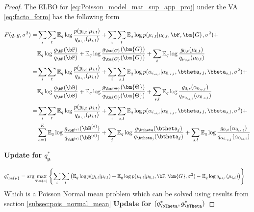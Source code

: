  
\begin{proof}

The ELBO for \ref{eq:Poisson_model_mat_sup_app_proj}  under the VA \ref{eq:facto_form} has the following form

 
 
 \begin{align}\label{eq:ELBO}
     F(q, g, \sigma^2) =& \sum_i \sum_t \mathbb{E}_q \log \frac{p(y_{i,t }|  \mu_{i,t}) }{q_{\mu_{i,t}}(\mu_{i,t} )}+ \sum_i\sum_{t}  \mathbb{E}_q  \log p(\mu_{i,t}|\mu_{0,t},  \bF, \bm{G}, \sigma^2)+ \\ 
     &    \mathbb{E}_q  \log \frac{g_{\bF}  (\bF ) }{q_{\bF } (\bF )}+ \mathbb{E}_q  \log \frac{g_{\bm{G}}  (\bm{G} ) }{q_{\bm{G} } (\bm{G} )}+ \sum_{t}  \mathbb{E}_q \log \frac{g_{0,t}(  \mu_{0,t})}{q_{   \mu_{0,t}}(\mu_{0,t})}\\
      =& \sum_i \sum_t \mathbb{E}_q \log \frac{p(y_{i,t }|  \mu_{i,t}) }{q_{\mu_{i,t}}(\mu_{i,t} )}+ \sum_i\sum_{s,l}  \mathbb{E}_q  \log p(\alpha_{i,_{s,l}}|\alpha_{0,_{s,l}},  \btheta_{ s,l}, \bbeta_{ s,l}, \sigma^2)+ \\ 
     &    \mathbb{E}_q  \log \frac{g_{\bB}  (\bB ) }{q_{\bB } (\bB )}+ \mathbb{E}_q  \log \frac{g_{\bm{\Theta}}  (\bm{\Theta} ) }{q_{\bm{\Theta} } (\bm{\Theta} )}+ \sum_{s,l}  \mathbb{E}_q \log \frac{g_{0,s}(  \alpha_{0,_{s,l}})}{q_{   \alpha_{0,_{s,l}}}(\alpha_{0,_{s,l}})}\\
     =& \sum_i \sum_t \mathbb{E}_q \log \frac{p(y_{i,t }|  \mu_{i,t}) }{q_{\mu_{i,t}}(\mu_{i,t} )}+ \sum_i\sum_{s,l}  \mathbb{E}_q  \log p(\alpha_{i,_{s,l}}|\alpha_{0,_{s,l}},  \btheta_{ s,l}, \bbeta_{ s,l}, \sigma^2)+\\
     &\sum_{e=1}^E \mathbb{E}_q  \log \frac{g_{\bB^{(e)}}  ( \bB^{(e)}) }{q_{ \bB^{(e)} } ( \bB^{(e)} )}+ \sum_j \mathbb{E}_q  \log \frac{g_{\btheta }  (\btheta_j  ) }{q_{\btheta_{j}  } (\btheta_j )}+ \sum_{s,l}  \mathbb{E}_q \log \frac{g_{0,s}(  \alpha_{0,_{s,l}})}{q_{   \alpha_{0,_{s,l}}}(\alpha_{0,_{s,l}})}
 \end{align}

  

\textbf{Update for $q_{\bm {\mu}}^{*}$}

\begin{align}
     q_{\bm {\mu}}^{*}&= \arg\max_{q_{\bm {\mu}}}\left\{\sum_i\sum_t \left( \mathbb{E}_q \log p(y_{i,t}| \mu_{i,t})+ \mathbb{E}_q \log p(\mu_{i,t}|\mu_{0,t},  \bF, \bm{G}, \sigma^2)- \mathbb{E}_q \log q_{\mu_{i,t}}(\mu_{i,t})\right)\right\}
\end{align}
Which is a Poisson Normal mean problem which can be solved using results from section \ref{subsec:pois_normal_mean}
\textbf{Update for $ (q_{\bTheta}^{*},g_{\bTheta}^*)$}


\end{proof}
